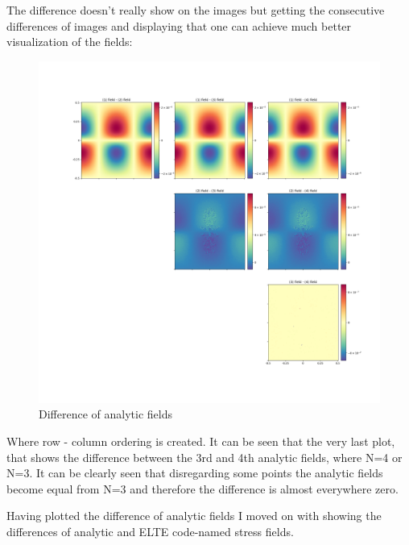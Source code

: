\documentclass[12pt,a4paper]{article}
\theoremstyle{plain}
\begin{document}
\begin{multicols*}{2}
	\vspace{1cm}

	\par The difference doesn't really show on the images but getting the
	consecutive differences of images and displaying that one can achieve
	much better visualization of the fields:

	\begin{figure}[H]
		\centering
		\includegraphics[width=.8\columnwidth]{./difference_of_analytic_fields.png}
		\caption{Difference of analytic fields}
	\end{figure}

	\par Where row - column ordering is created. It can be seen that the very last plot,
	that shows the difference between the 3rd and 4th analytic fields, where N=4 or N=3.
	It can be clearly seen that disregarding some points the analytic fields become equal from N=3
	and therefore the difference is almost everywhere zero.

	\vspace{1cm}

	\par Having plotted the difference of analytic fields I moved on with
	showing the differences of analytic and ELTE code-named stress fields.


\end{multicols*}
\end{document}
